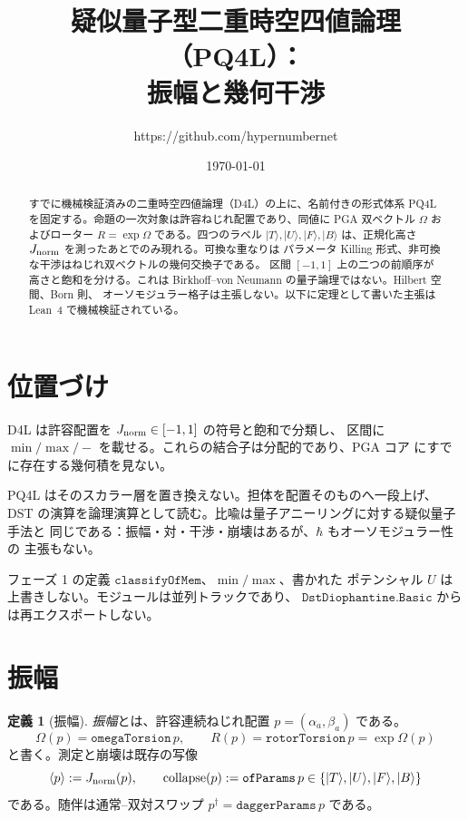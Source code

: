 \documentclass[dvipdfmx,11pt,a4paper]{article}
\title{疑似量子型二重時空四値論理（PQ4L）：\\
振幅と幾何干渉}
\author{https://github.com/hypernumbernet}
\date{\today}
\theoremstyle{definition}
\newtheorem{definition}[theorem]{定義}
\theoremstyle{remark}
\newcommand{\Jnorm}{J_{\rm norm}}
\begin{document}
\maketitle

\begin{abstract}
すでに機械検証済みの二重時空四値論理（D4L）の上に、名前付きの形式体系
PQ4L を固定する。命題の一次対象は許容ねじれ配置であり、同値に PGA
双ベクトル \(\Omega\) およびローター \(R=\exp\Omega\) である。四つのラベル
\(\lvert T\rangle,\lvert U\rangle,\lvert F\rangle,\lvert B\rangle\)
は、正規化高さ \(\Jnorm\) を測ったあとでのみ現れる。可換な重なりは
パラメータ Killing 形式、非可換な干渉はねじれ双ベクトルの幾何交換子である。
区間 \([-1,1]\) 上の二つの前順序が高さと飽和を分ける。これは
Birkhoff--von Neumann の量子論理ではない。Hilbert 空間、Born 則、
オーソモジュラー格子は主張しない。以下に定理として書いた主張は Lean~4
で機械検証されている。
\end{abstract}

\section{位置づけ}

D4L \cite{D4L2026} は許容配置を \(\Jnorm\in[-1,1]\) の符号と飽和で分類し、
区間に \(\min/\max/-\) を載せる。これらの結合子は分配的であり、PGA
コア \cite{Diophantine2026} にすでに存在する幾何積を見ない。

PQ4L はそのスカラー層を置き換えない。担体を配置そのものへ一段上げ、
DST の演算を論理演算として読む。比喩は量子アニーリングに対する疑似量子手法と
同じである：振幅・対・干渉・崩壊はあるが、\(\hbar\) もオーソモジュラー性の
主張もない。

フェーズ 1 の定義 \(\texttt{classifyOfMem}\)、\(\min/\max\)、書かれた
ポテンシャル \(U\) は上書きしない。モジュールは並列トラックであり、
\(\texttt{DstDiophantine.Basic}\) からは再エクスポートしない。

\section{振幅}

\begin{definition}[振幅]
\label{def:amp}
\emph{振幅}とは、許容連続ねじれ配置 \(p=(\alpha_a,\beta_a)\) である。
\[
\Omega(p)=\texttt{omegaTorsion}\,p,\qquad
R(p)=\texttt{rotorTorsion}\,p=\exp\Omega(p)
\]
と書く。測定と崩壊は既存の写像
\[
\langle p\rangle:=\Jnorm(p),\qquad
\mathrm{collapse}(p):=\texttt{ofParams}\,p\in\{\lvert T\rangle,\lvert U\rangle,\lvert F\rangle,\lvert B\rangle\}
\]
である。随伴は通常–双対スワップ \(p^\dagger=\texttt{daggerParams}\,p\) である。
\end{definition}
\end{document}
